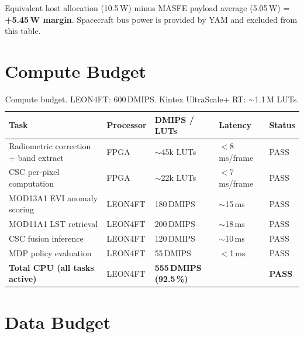\noindent Equivalent host allocation (10.5\,W) minus MASFE payload average (5.05\,W) = \textbf{+5.45\,W margin}. Spacecraft bus power is provided by YAM and excluded from this table.

\section*{Compute Budget}

\begin{table}[htb]
  \centering
  \caption{Compute budget. LEON4FT: 600\,DMIPS. Kintex UltraScale+ RT: $\sim$1.1\,M LUTs.}
  \small
  \begin{tabularx}{\textwidth}{p{4.8cm}p{2.2cm}p{2.0cm}p{2.0cm}X}
    \toprule
    \textbf{Task} & \textbf{Processor} & \textbf{DMIPS / LUTs} & \textbf{Latency} & \textbf{Status} \\
    \midrule
    Radiometric correction + band extract & FPGA       & $\sim$45k LUTs & $<$8\,ms/frame  & PASS \\
    CSC per-pixel computation             & FPGA       & $\sim$22k LUTs & $<$7\,ms/frame  & PASS \\
    MOD13A1 EVI anomaly scoring           & LEON4FT    & 180\,DMIPS     & $\sim$15\,ms    & PASS \\
    MOD11A1 LST retrieval                 & LEON4FT    & 200\,DMIPS     & $\sim$18\,ms    & PASS \\
    CSC fusion inference                  & LEON4FT    & 120\,DMIPS     & $\sim$10\,ms    & PASS \\
    MDP policy evaluation                 & LEON4FT    & 55\,DMIPS      & $<$1\,ms        & PASS \\
    \midrule
    \textbf{Total CPU (all tasks active)} & LEON4FT    & \textbf{555\,DMIPS (92.5\,\%)} & & \textbf{PASS} \\
    \bottomrule
  \end{tabularx}
\end{table}

\section*{Data Budget}


